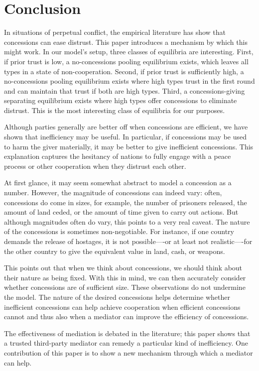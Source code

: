 \documentclass[bibtex,autowc]{apsr_submission}
\begin{document}
\section{Conclusion}
In situations of perpetual conflict, the empirical literature has show that concessions can ease distrust. This paper introduces a mechanism by which this might work. In our model's setup, three classes of equilibria are interesting. First, if prior trust is low, a no-concessions pooling equilibrium exists, which leaves all types in a state of non-cooperation. Second, if prior trust is sufficiently high, a no-concessions pooling equilibrium exists where high types trust in the first round and can maintain that trust if both are high types. Third, a concessions-giving separating equilibrium exists where high types offer concessions to eliminate distrust. This is the most interesting class of equilibria for our purposes.

Although parties generally are better off when concessions are efficient, we have shown that inefficiency may be useful. In particular, if concessions may be used to harm the giver materially, it may be better to give inefficient concessions. This explanation captures the hesitancy of nations to fully engage with a peace process or other cooperation when they distrust each other. 

At first glance, it may seem somewhat abstract to model a concession as a number. However, the magnitude of concessions can indeed vary: often, concessions do come in sizes, for example, the number of prisoners released, the amount of land ceded, or the amount of time given to carry out actions. But although magnitudes often do vary, this points to a very real caveat. The nature of the concessions is sometimes non-negotiable. For instance, if one country demands the release of hostages, it is not possible----or at least not realistic----for the other country to give the equivalent value in land, cash, or weapons.

This points out that when we think about concessions, we should think about their nature as being fixed. With this in mind, we can then accurately consider whether concessions are of sufficient size. These observations do not undermine the model. The nature of the desired concessions helps determine whether inefficient concessions can help achieve cooperation when efficient concessions cannot and thus also when a mediator can improve the efficiency of concessions.

The effectiveness of mediation is debated in the literature; this paper shows that a trusted third-party mediator can remedy a particular kind of inefficiency. One contribution of this paper is to show a new mechanism through which a mediator can help.
\end{document}
